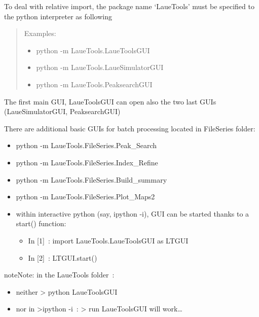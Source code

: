 \documentclass[letterpaper,10pt,english]{sphinxmanual}
\begin{document}
To deal with relative import, the package name ‘LaueTools’ must be specified to the python interpreter as following
\begin{quote}

Examples:
\begin{itemize}
\item {} 
python -m LaueTools.LaueToolsGUI

\item {} 
python -m LaueTools.LaueSimulatorGUI

\item {} 
python -m LaueTools.PeaksearchGUI

\end{itemize}
\end{quote}

The first main GUI, LaueToolsGUI can open also the two last GUIs (LaueSimulatorGUI, PeaksearchGUI)

There are additional basic GUIs for batch processing located in FileSeries folder:
\begin{itemize}
\item {} 
python -m LaueTools.FileSeries.Peak\_Search

\item {} 
python -m LaueTools.FileSeries.Index\_Refine

\item {} 
python -m LaueTools.FileSeries.Build\_summary

\item {} 
python -m LaueTools.FileSeries.Plot\_Maps2

\end{itemize}
\begin{itemize}
\item {} 
within interactive python (say, ipython -i), GUI can be started thanks to a start() function:
\begin{itemize}
\item {} 
In {[}1{]} : import LaueTools.LaueToolsGUI as LTGUI

\item {} 
In {[}2{]} : LTGUI.start()

\end{itemize}

\end{itemize}

\begin{sphinxadmonition}{note}{Note:}
in the LaueTools folder :
\begin{itemize}
\item {} 
neither \textgreater{} python LaueToolsGUI

\item {} 
nor in \textgreater{}ipython -i :  \textgreater{} run LaueToolsGUI  will work…

\end{itemize}
\end{sphinxadmonition}
\end{document}
